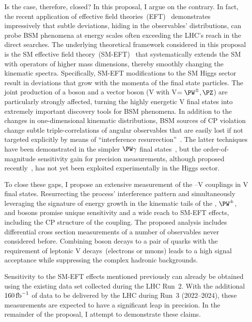\documentclass[a4paper,11pt]{article}
\newcommand{\Pb}{{{\Pqb}}\xspace}
\renewcommand{\PV}{{{{V}}}\xspace}
\newcommand{\VH}{{{\PV}{\PH}}\xspace}
\begin{document}
Is the case, therefore, closed? 
In this proposal, I argue on the contrary. 
In fact, the recent application of effective field theories~(EFT)~\cite{Grinstein:1991cd,Chiu:2007dg,Passarino:2016pzb} demonstrates impressively that subtle deviations, hiding in the observables' distributions, can probe BSM phenomena at energy scales often exceeding the LHC's reach in the direct searches. 
The underlying theoretical framework considered in this proposal is the SM effective field theory~(SM-EFT)~\cite{Jenkins:2013zja,Alonso:2013hga,Jenkins:2013wua,Englert:2014cva,Brivio:2017vri} that systematically extends the SM with operators of higher mass dimensions,  thereby smoothly changing the kinematic spectra.
Specifically,  SM-EFT modifications to the SM Higgs sector result in deviations that grow with the momenta of the final state particles. 
The joint production of a \PH boson and a vector boson (\VH with \PV$=\PW^{\pm},\PZ$) are particularly strongly affected, turning the highly energetic \VH final states into extremely important discovery tools for BSM phenomena. 
In addition to the changes in one-dimensional kinematic distributions, 
BSM sources of CP violation change subtle triple-correlations of angular observables that are easily lost if not targeted explicitly by means of ``interference resurrection''~\cite{Panico:2017frx}.
The latter techniques have been demonstrated in the simpler $\PW\gamma$ final states~\cite{CMS-PAS-SMP-20-005}, but the order-of-magnitude sensitivity gain for precision measurements, although proposed recently~\cite{Banerjee:2019twi}, has not yet been exploited experimentally in the Higgs sector.  

To close these gaps, I propose an extensive measurement of the \PH--\PV couplings in \VH final states. 
Resurrecting the process' interference pattern and simultaneously leveraging the signature of energy growth in the kinematic tails of the \PH, $\PW^{\pm}$, and \PZ bosons promise unique sensitivity and a wide reach to SM-EFT effects, including the CP structure of the coupling.
The proposed analysis includes differential cross section measurements of a number of observables never considered before.
Combining \PH boson decays to a pair of \Pb quarks with the requirement of leptonic \PV decays~(electrons or muons) leads to a high signal acceptance while suppressing the complex hadronic backgrounds.  
 
Sensitivity to the SM-EFT effects mentioned previously can already be obtained using the existing data set collected during the LHC Run~2. 
With the additional $160\mbox{\ensuremath{\,\text{fb}^{-1}}}$ of data to be delivered by the LHC during Run~3 (2022--2024), these measurements are expected to have a significant leap in precision. 
In the remainder of the proposal, I attempt to demonstrate these claims.
\end{document}
